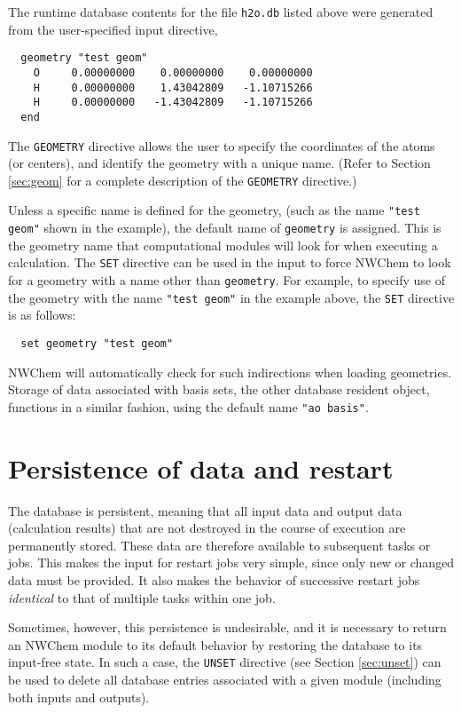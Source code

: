 The runtime database contents for the file \verb+h2o.db+ listed above
were generated from the user-specified input directive,
\begin{verbatim}
  geometry "test geom"
    O     0.00000000    0.00000000    0.00000000
    H     0.00000000    1.43042809   -1.10715266
    H     0.00000000   -1.43042809   -1.10715266
  end
\end{verbatim}
The \verb+GEOMETRY+ directive allows the user to specify the
coordinates of the atoms (or centers), and identify the geometry with
a unique name.  (Refer to Section \ref{sec:geom} for a complete
description of the {\tt GEOMETRY} directive.)

Unless a specific name is defined for the geometry, (such as the name
\verb+"test geom"+ shown in the example), the default name of
\verb+geometry+ is assigned.  This is the geometry name that
computational modules will look for when executing a calculation.  The
{\tt SET} directive can be used in the input to force NWChem to look
for a geometry with a name other than \verb+geometry+.  For example,
to specify use of the geometry with the name \verb+"test geom"+ in the
example above, the \verb+SET+ directive is as follows:

\begin{verbatim}
  set geometry "test geom"
\end{verbatim}

NWChem will automatically check for such indirections when loading
geometries.  Storage of data associated with basis sets, the other
database resident object, functions in a similar fashion, using the
default name \verb+"ao basis"+.

\section{Persistence of data and restart}
\label{sec:persist}

The database is persistent, meaning that all input data and output
data (calculation results) that are not destroyed in the course of
execution are permanently stored.  These data are therefore available
to subsequent tasks or jobs.  This makes the input for restart jobs
very simple, since only new or changed data must be provided.  It also
makes the behavior of successive restart jobs {\em identical} to that
of multiple tasks within one job.

Sometimes, however, this persistence is undesirable, and it is
necessary to return an NWChem module to its default behavior by
restoring the database to its input-free state.  In such a case, the
\verb+UNSET+ directive (see Section \ref{sec:unset}) can be used to
delete all database entries associated with a given module (including
both inputs and outputs).

